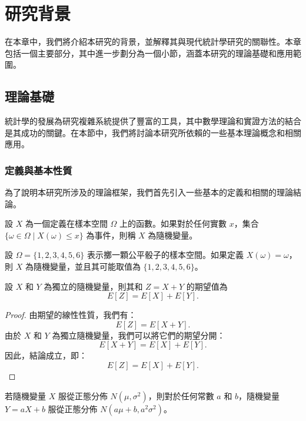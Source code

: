 \chapter{研究背景}
\label{c:background}

在本章中，我們將介紹本研究的背景，並解釋其與現代統計學研究的關聯性。本章包括一個主要部分，其中進一步劃分為一個小節，涵蓋本研究的理論基礎和應用範圍。

\section{理論基礎}

統計學的發展為研究複雜系統提供了豐富的工具，其中數學理論和實證方法的結合是其成功的關鍵。在本節中，我們將討論本研究所依賴的一些基本理論概念和相關應用。

\subsection{定義與基本性質}

為了說明本研究所涉及的理論框架，我們首先引入一些基本的定義和相關的理論結論。

\begin{definition}[隨機變量]
  設 \( X \) 為一個定義在樣本空間 \( \Omega \) 上的函數。如果對於任何實數 \( x \)，集合 \( \{\omega \in \Omega \mid X(\omega) \leq x\} \) 為事件，則稱 \( X \) 為隨機變量。
\end{definition}

\begin{example}
  設 \( \Omega = \{1, 2, 3, 4, 5, 6\} \) 表示擲一顆公平骰子的樣本空間。如果定義 \( X(\omega) = \omega \)，則 \( X \) 為隨機變量，並且其可能取值為 \( \{1, 2, 3, 4, 5, 6\} \)。
\end{example}

\begin{proposition}
  設 \( X \) 和 \( Y \) 為獨立的隨機變量，則其和 \( Z = X + Y \) 的期望值為
  \[
    E[Z] = E[X] + E[Y].
  \]
\end{proposition}

\begin{proof}
  由期望的線性性質，我們有：
  \[
    E[Z] = E[X + Y].
  \]
  由於 \( X \) 和 \( Y \) 為獨立隨機變量，我們可以將它們的期望分開：
  \[
    E[X + Y] = E[X] + E[Y].
  \]
  因此，結論成立，即：
  \[
    E[Z] = E[X] + E[Y].
  \]
\end{proof}

\begin{lemma}
  若隨機變量 \( X \) 服從正態分佈 \( N(\mu, \sigma^2) \)，則對於任何常數 \( a \) 和 \( b \)，隨機變量 \( Y = aX + b \) 服從正態分佈 \( N(a\mu + b, a^2\sigma^2) \)。
\end{lemma}

